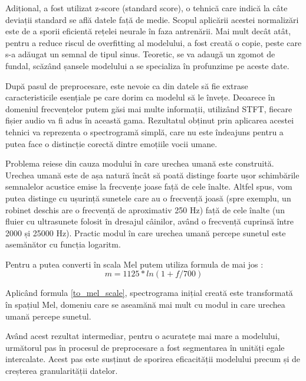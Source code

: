 \documentclass[a4paper, 12pt]{report}
\begin{document}
	Adițional, a fost utilizat z-score (standard score), o tehnică care indică la câte deviații standard se află datele față de medie. Scopul aplicării acestei normalizări este de a sporii eficientă rețelei neurale în faza antrenării. Mai mult decât atât, pentru a reduce riscul de overfitting al modelului, a fost creată o copie, peste care s-a adăugat un semnal de tipul sinus. Teoretic, se va adaugă un zgomot de fundal, scăzând șansele modelului a se specializa în profunzime pe aceste date.
	
	După pasul de preprocesare, este nevoie ca din datele să fie extrase caracteristicile esențiale pe care dorim ca modelul să le învețe. Deoarece în domeniul frecvențelor putem găsi mai multe informații, utilizând STFT, fiecare fișier audio va fi adus în această gama. Rezultatul obținut prin aplicarea acestei tehnici va reprezenta o spectrogramă simplă, care nu este îndeajuns pentru a putea face o distincție corectă dintre emoțiile vocii umane. 
	
	Problema reiese din cauza modului în care urechea umană este construită. Urechea umană este de așa natură încât să poată distinge foarte ușor schimbările semnalelor acustice emise la frecvențe joase față de cele înalte. Altfel spus, vom putea distinge cu ușurință sunetele care au o frecvență joasă (spre exemplu, un robinet deschis are o frecvență de aproximativ 250 Hz) față de cele înalte (un fluier cu ultrasunete folosit în dresajul câinilor, având o frecvență cuprinsă între 2000 și 25000 Hz). Practic modul în care urechea umană percepe sunetul este asemănător cu funcția logaritm.
	
	Pentru a putea converti în scala Mel putem utiliza formula de mai jos :
	\begin{equation}
	\label{to_mel_scale}
		m=1125 * ln(1+f/700)
	\end{equation}
	
	Aplicând formula \ref{to_mel_scale}, spectrograma inițial creată este transformată în spațiul Mel, domeniu care se aseamănă mai mult cu modul in care urechea umană percepe sunetul.
	
	Având acest rezultat intermediar, pentru o acuratețe mai mare a modelului, următorul pas în procesul de preprocesare a fost segmentarea în unități egale intercalate. Acest pas este susținut de sporirea eficacității modelului precum și de creșterea granularității datelor.
	
\end{document}
